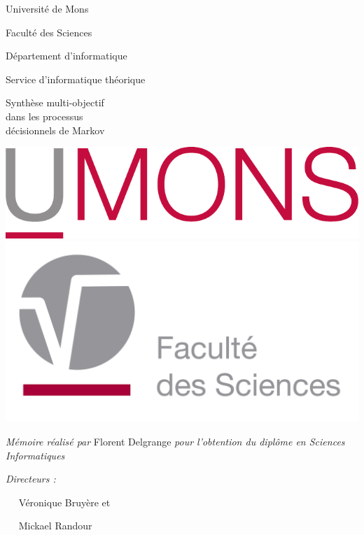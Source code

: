 \documentclass[11pt, twoside]{report}
\newcommand{\umonslogo}{\includegraphics[width=0.25\linewidth]{UMONS.pdf} \hfill                     \includegraphics[width=0.25\linewidth]{UMONS_FS.jpg}
                       }
\newcommand{\HRule}{\rule{\linewidth}{0.3mm}\\} %
\begin{document}
\thispagestyle{title}
{\selectfont
\begin{mdframed}[style=l3style]
\huge Université de Mons
\end{mdframed}
}

\begin{adjustbox}{minipage=.6\textwidth,center}
Faculté des Sciences\par
Département d'informatique \par
Service d'informatique théorique
\end{adjustbox}

\vspace{4em}
\vspace{1em}

{\selectfont
\vspace{0.3em}
\begin{mdframed}[style=l3style]
Synthèse multi-objectif\\dans les processus\\décisionnels de Markov
\end{mdframed}
}
\umonslogo

\vspace{3em}


\vspace{.3\linewidth}
\begin{adjustbox}{minipage=.6\textwidth,right}
\large
\begin{flushright}
\textit{Mémoire réalisé par} Florent Delgrange \textit{pour l'obtention du diplôme en Sciences Informatiques}\par
\end{flushright}
\textit{Directeurs : } \par $\quad$ Véronique Bruyère et \par
$\quad$ Mickael Randour
\end{adjustbox}
\clearpage %

\begingroup
  \pagestyle{empty}
  \null
  \newpage
\endgroup
\tableofcontents
\clearpage %
\begingroup
  \thispagestyle{empty}
  \null
  \newpage
\endgroup
% 
% 
% 
% 
% 




% 
\end{document}
